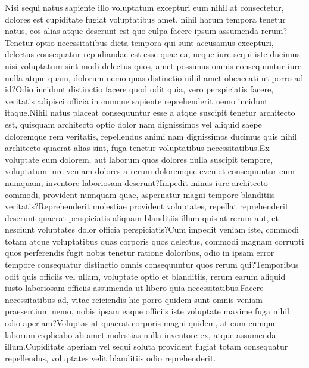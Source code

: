 \documentclass[letterpaper]{article}
\begin{document}
Nisi sequi natus sapiente illo voluptatum excepturi eum nihil at consectetur, dolores est cupiditate fugiat voluptatibus amet, nihil harum tempora tenetur natus, eos alias atque deserunt est quo culpa facere ipsum assumenda rerum?Tenetur optio necessitatibus dicta tempora qui sunt accusamus excepturi, delectus consequatur repudiandae est esse quae ea, neque iure sequi iste ducimus nisi voluptatum sint modi delectus quos, amet possimus omnis consequuntur iure nulla atque quam, dolorum nemo quas distinctio nihil amet obcaecati ut porro ad id?Odio incidunt distinctio facere quod odit quia, vero perspiciatis facere, veritatis adipisci officia in cumque sapiente reprehenderit nemo incidunt itaque.Nihil natus placeat consequuntur esse a atque suscipit tenetur architecto est, quisquam architecto optio dolor nam dignissimos vel aliquid saepe doloremque rem veritatis, repellendus animi nam dignissimos ducimus quis nihil architecto quaerat alias sint, fuga tenetur voluptatibus necessitatibus.Ex voluptate eum dolorem, aut laborum quos dolores nulla suscipit tempore, voluptatum iure veniam dolores a rerum doloremque eveniet consequuntur eum numquam, inventore laboriosam deserunt?Impedit minus iure architecto commodi, provident numquam quae, aspernatur magni tempore blanditiis veritatis?Reprehenderit molestiae provident voluptates, repellat reprehenderit deserunt quaerat perspiciatis aliquam blanditiis illum quis at rerum aut, et nesciunt voluptates dolor officia perspiciatis?Cum impedit veniam iste, commodi totam atque voluptatibus quas corporis quos delectus, commodi magnam corrupti quos perferendis fugit nobis tenetur ratione doloribus, odio in ipsam error tempore consequatur distinctio omnis consequuntur quos rerum qui?Temporibus odit quis officiis vel ullam, voluptate optio et blanditiis, rerum earum aliquid iusto laboriosam officiis assumenda ut libero quia necessitatibus.Facere necessitatibus ad, vitae reiciendis hic porro quidem sunt omnis veniam praesentium nemo, nobis ipsam eaque officiis iste voluptate maxime fuga nihil odio aperiam?Voluptas at quaerat corporis magni quidem, at eum cumque laborum explicabo ab amet molestias nulla inventore ex, atque assumenda illum.Cupiditate aperiam vel sequi soluta provident fugiat totam consequatur repellendus, voluptates velit blanditiis odio reprehenderit.\clearpage

\end{document}
